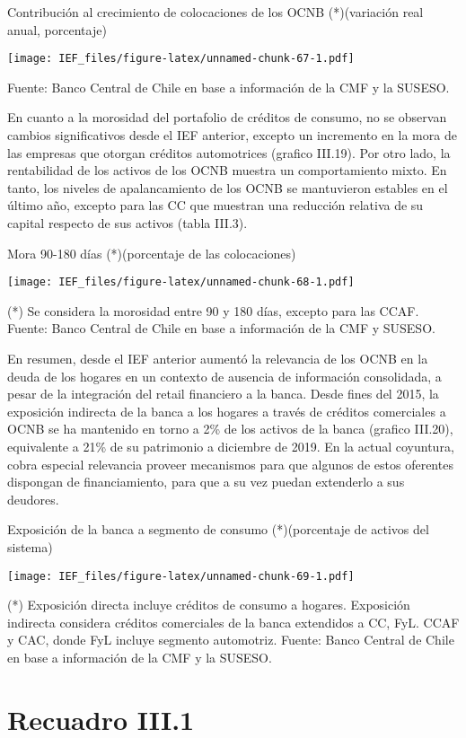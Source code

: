 \documentclass[
]{book}
\begin{document}
Contribución al crecimiento de colocaciones de los OCNB (*)(variación real anual, porcentaje)

\texttt{[image: IEF\_files/figure-latex/unnamed-chunk-67-1.pdf]}

Fuente: Banco Central de Chile en base a información de la CMF y la SUSESO.

En cuanto a la morosidad del portafolio de créditos de consumo, no se observan
cambios significativos desde el IEF anterior, excepto un incremento en la mora
de las empresas que otorgan créditos automotrices (grafico III.19). Por otro
lado, la rentabilidad de los activos de los OCNB muestra un comportamiento
mixto. En tanto, los niveles de apalancamiento de los OCNB se mantuvieron
estables en el último año, excepto para las CC que muestran una reducción
relativa de su capital respecto de sus activos (tabla III.3).

Mora 90-180 días (*)(porcentaje de las colocaciones)

\texttt{[image: IEF\_files/figure-latex/unnamed-chunk-68-1.pdf]}

(*) Se considera la morosidad entre 90 y 180 días, excepto para las CCAF.
Fuente: Banco Central de Chile en base a información de la CMF y SUSESO.

En resumen, desde el IEF anterior aumentó la relevancia de los OCNB en la
deuda de los hogares en un contexto de ausencia de información consolidada,
a pesar de la integración del retail financiero a la banca. Desde fines del
2015, la exposición indirecta de la banca a los hogares a través de créditos
comerciales a OCNB se ha mantenido en torno a 2\% de los activos de la banca
(grafico III.20), equivalente a 21\% de su patrimonio a diciembre de 2019. En
la actual coyuntura, cobra especial relevancia proveer mecanismos para que
algunos de estos oferentes dispongan de financiamiento, para que a su vez
puedan extenderlo a sus deudores.

Exposición de la banca a segmento de consumo (*)(porcentaje de activos del sistema)

\texttt{[image: IEF\_files/figure-latex/unnamed-chunk-69-1.pdf]}

(*) Exposición directa incluye créditos de consumo a hogares. Exposición indirecta considera créditos comerciales de la banca extendidos a CC, FyL. CCAF y CAC, donde FyL incluye segmento automotriz.
Fuente: Banco Central de Chile en base a información de la CMF y la SUSESO.

\hypertarget{R3}{%
\section*{Recuadro III.1}\label{R3}}
\end{document}
